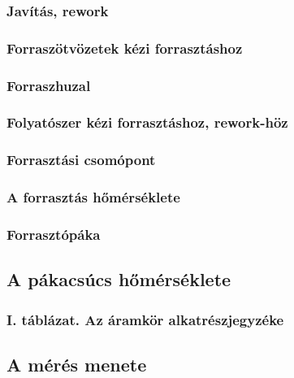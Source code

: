 \documentclass[12pt]{article}
\begin{document}
			\subsubsection{Javítás, rework}

			\subsubsection{Forraszötvözetek kézi forrasztáshoz}

			\subsubsection{Forraszhuzal}

			\subsubsection{Folyatószer kézi forrasztáshoz, rework-höz}

			\subsubsection{Forrasztási csomópont}

			\subsubsection{A forrasztás hőmérséklete}

			\subsubsection{Forrasztópáka}

			\subsubsection{}

		\subsection{A pákacsúcs hőmérséklete}

			\subsubsection{I. táblázat. Az áramkör alkatrészjegyzéke}

		\subsection{A mérés menete}
\end{document}
